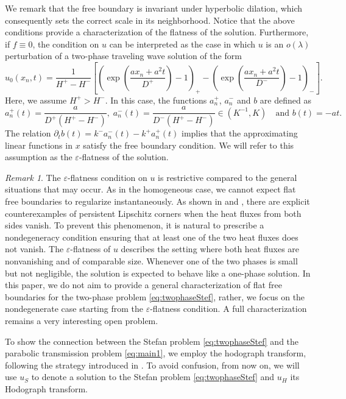 \documentclass[12pt]{article}
\numberwithin{Theorem}{section}
\theoremstyle{definition}
\theoremstyle{remark}
\newtheorem{Remark}[Theorem]{Remark}
\numberwithin{equation}{section}
\newcommand{\p}{\partial}
\newcommand{\eps}{\varepsilon}
\begin{document}
We remark that the free boundary is invariant under hyperbolic dilation, which consequently sets the correct scale in its neighborhood. 
Notice that the above conditions provide a characterization of the flatness of the solution.
Furthermore, if $f \equiv 0$, the condition on $u$ can be  interpreted as the case in which $u$ is an $o(\lambda)$ perturbation of a two-phase traveling wave solution of the form
\begin{equation}
    u_0(x_n,t) = \frac{1}{H^+-H^-}\left[ \left(\exp\left(\frac{ax_n + a^2 t}{D^+}\right) -1\right)_+ -\left(\exp \left( \frac{a x_n + a^2 t}{D^{-}} \right) -1\right)_-  \right].
\end{equation}
Here, we assume  $H^+>H^{-}$. 
 In this case, the functions $a_n^+$, $a_n^-$ and $b$ are defined as
 \[
 a_n^+(t)= \frac{a}{D^+(H^+-H^-)}, \; a_n^{-}(t)=\frac{a}{D^-(H^+-H^-)} \in (K^{-1},K) \quad \text{and $b(t)=-at$}.
 \]
The relation ${\p_t} b(t)=k^{-}a_n^-(t)-k^{+}a_n^+(t)$ implies that the approximating linear functions in $x$ satisfy the free boundary condition. We will refer to this assumption as the $\eps$-flatness of the solution. 


\begin{Remark}

The $\eps$-flatness condition on $u$ is restrictive compared to the general situations that may occur. As in the homogeneous case, we cannot expect flat free boundaries to regularize instantaneously. As shown in \cite[Section 8.3]{CS} and \cite[Section 10]{ACS2}, there are explicit counterexamples of persistent Lipschitz corners when the heat fluxes from both sides vanish. To prevent this phenomenon, it is natural to prescribe a nondegeneracy condition ensuring that at least one of the two heat fluxes does not vanish. The $\eps$-flatness of $u$ describes the setting where both heat fluxes are nonvanishing and of comparable size. Whenever one of the two phases is small but not negligible, the solution is expected to behave like a one-phase solution.
In this paper, we do not aim to provide a general characterization of flat free boundaries for the two-phase problem \eqref{eq:twophaseStef}, rather, we focus  on the nondegenerate case starting from the $\eps$-flatness condition. A full characterization remains a very interesting open problem.


\end{Remark}

To show the connection between the Stefan problem \eqref{eq:twophaseStef} and the parabolic transmission problem \eqref{eq:main1}, we employ the hodograph transform, following the strategy introduced in \cite{DFS23}.
 To avoid confusion, from now on, we will use $u_{S}$ to denote a solution to the Stefan problem \eqref{eq:twophaseStef} and $u_H$ its Hodograph transform.
\end{document}

